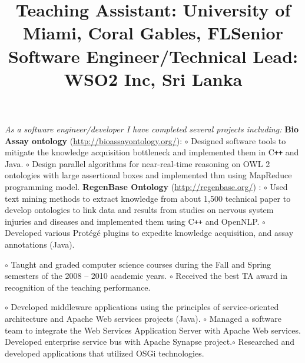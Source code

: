 \begin{resume}
\begin{position}
\textit{As a software engineer/developer I have completed several projects including:}\newline
\textbf{Bio Assay ontology} (\url{http://bioassayontology.org/}): \newline
$\circ$ Designed software tools to mitigate the knowledge acquisition bottleneck and 
implemented them in C\texttt{++} and Java. \newline
$\circ$ Design parallel algorithms for near-real-time reasoning on OWL 2 ontologies with large 
assertional boxes and implemented thm using MapReduce programming model. \newline
\textbf{RegenBase Ontology} (\url{http://regenbase.org/}) : \newline 
$\circ$ Used text mining methods to extract knowledge from about 1,500 technical paper to develop 
ontologies to link data 
and results from studies on nervous system injuries and diseases and implemented 
them using C\texttt{++} and 
OpenNLP. \newline $\circ$ Developed  various Prot\'{e}g\'{e} plugins to 
expedite knowledge acquisition, and assay annotations (Java).


\end{position}

\title{\textbf{Teaching Assistant: University of Miami, Coral Gables, FL}}
\begin{position}
$\circ$  Taught and graded computer science courses during the Fall and Spring
semesters of the 2008 -- 2010 academic years. \newline $\circ$   Received the best TA award in 
recognition of the teaching
performance.
\end{position}

\title{\textbf{Senior Software Engineer/Technical Lead: WSO2 Inc, Sri Lanka}}
\begin{position}
$\circ$ Developed middleware applications using the principles of service-oriented 
architecture and Apache Web services projects (Java).   \newline $\circ$ 
Managed a software team to integrate the Web Services Application Server with Apache Web services. 
Developed enterprise service bus with Apache Synapse project.\newline $\circ$ Researched and 
developed 
applications that utilized OSGi technologies. 
\end{position}


\end{resume}
